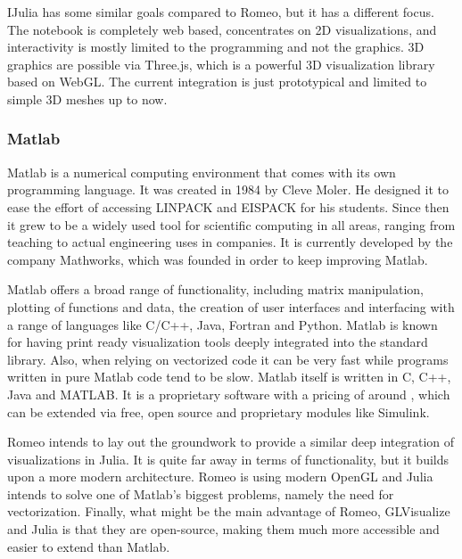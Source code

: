 IJulia has some similar goals compared to Romeo, but it has a different focus.
The notebook is completely web based, concentrates on 2D visualizations, and interactivity is mostly limited to the programming and not the graphics.
3D graphics are possible via Three.js, which is a powerful 3D visualization library based on \ac{WebGL}.
The current integration is just prototypical and limited to simple 3D meshes up to now\cite{Meshes}\cite{Compose3D}.


\subsubsection{Matlab}

\ac{Matlab} is a numerical computing environment that comes with its own programming language.
It was created in 1984 by Cleve Moler. He designed it to ease the effort of accessing LINPACK and EISPACK for his students.
Since then it grew to be a widely used tool for scientific computing in all areas, ranging from teaching to actual engineering uses in companies. It is currently developed by the company Mathworks, which was founded in order to keep improving Matlab.

Matlab offers a broad range of functionality, including matrix manipulation, plotting of functions and data, the creation of user interfaces and interfacing with a range of languages like C/C++, Java, Fortran and Python. 
Matlab is known for having print ready visualization tools deeply integrated into the standard library.
Also, when relying on vectorized code it can be very fast while programs written in pure Matlab code tend to be slow.
\ac{Matlab} itself is written in C, C++, Java and MATLAB.
It is a proprietary software with a pricing of around \cite{MatlabPricing}, which can be extended via free, open source and proprietary modules like Simulink.

Romeo intends to lay out the groundwork to provide a similar deep integration of visualizations in Julia. 
It is quite far away in terms of functionality, but it builds upon a more modern architecture.
Romeo is using modern OpenGL and Julia intends to solve one of Matlab's biggest problems, namely the need for vectorization.
Finally, what might be the main advantage of Romeo, GLVisualize and Julia is that they are open-source, making them much more accessible and easier to extend than Matlab.


